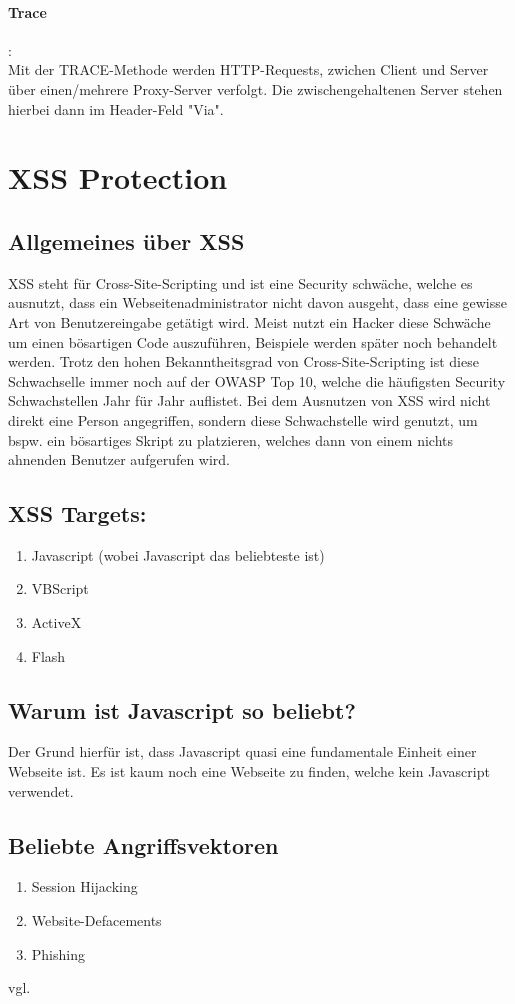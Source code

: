\paragraph{Trace}:\\Mit der TRACE-Methode werden HTTP-Requests, zwichen Client und Server über einen/mehrere Proxy-Server verfolgt. Die zwischengehaltenen Server stehen hierbei dann im Header-Feld "Via".
\section{XSS Protection}
\label{sec:xss}
\subsection{Allgemeines über XSS}
\label{sec:xss_allgemein}
XSS steht für Cross-Site-Scripting und ist eine Security schwäche, welche es ausnutzt, dass ein Webseitenadministrator nicht davon ausgeht, dass eine gewisse Art von Benutzereingabe getätigt wird. Meist nutzt ein Hacker diese Schwäche um einen bösartigen Code auszuführen, Beispiele werden später noch behandelt werden. Trotz den hohen Bekanntheitsgrad von Cross-Site-Scripting ist diese Schwachselle immer noch auf der OWASP Top 10, welche die häufigsten Security Schwachstellen Jahr für Jahr auflistet. Bei dem Ausnutzen von XSS wird nicht direkt eine Person angegriffen, sondern diese Schwachstelle  wird genutzt, um bspw. ein bösartiges Skript zu platzieren, welches dann von einem nichts ahnenden Benutzer aufgerufen wird. 
\subsection{XSS Targets:}
\label{sec:xss_targets}
\begin{enumerate}
\item Javascript (wobei Javascript das beliebteste ist) 
\item VBScript 
\item ActiveX
\item Flash
\end{enumerate}
\subsection{Warum ist Javascript so beliebt?}
\label{sec:xss_why}
Der Grund hierfür ist, dass Javascript quasi eine fundamentale Einheit einer Webseite ist. Es ist kaum noch eine Webseite zu finden, welche kein Javascript verwendet.
\subsection{Beliebte Angriffsvektoren}
\label{sec:xss_bel_agg}
\begin{enumerate}
\item Session Hijacking
\item Website-Defacements 
\item Phishing
\end{enumerate}
vgl. \textcite{XSS}
